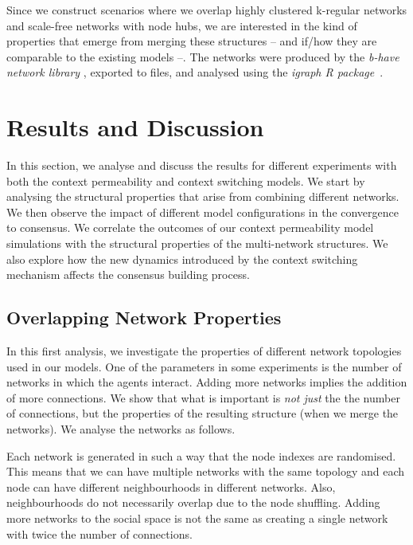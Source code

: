 \documentclass[preprint,number]{elsarticle}
\begin{document}
        Since we construct scenarios where we overlap highly clustered k-regular networks and
        scale-free networks with node hubs, we are interested in the kind of properties that emerge
        from merging these structures -- and if/how they are comparable to the existing models
        --. The networks were produced by the \textit{b-have network library}
        \cite{Nunes:Software:11069}, exported to files, and analysed using the \textit{igraph R
          package}~\cite{igraph2006}.

        \section{Results and Discussion}
        \label{sec:results-discussion}

        \noindent In this section, we analyse and discuss the results for different experiments with
        both the context permeability and context switching models. We start by analysing the
        structural properties that arise from combining different networks. We then observe the
        impact of different model configurations in the convergence to consensus. We correlate the
        outcomes of our context permeability model simulations with the structural properties of the
        multi-network structures. We also explore how the new dynamics introduced by the context
        switching mechanism affects the consensus building process.

        \subsection{Overlapping Network Properties}
        \label{sec:network_properties}
        \noindent In this first analysis, we investigate the properties of different network
        topologies used in our models. One of the parameters in some experiments is the number of
        networks in which the agents interact. Adding more networks implies the addition of more
        connections. We show that what is important is \textit{not just} the the number of
        connections, but the properties of the resulting structure (when we merge the networks). We
        analyse the networks as follows.

        Each network is generated in such a way that the node indexes are randomised. This means
        that we can have multiple networks with the same topology and each node can have different
        neighbourhoods in different networks. Also, neighbourhoods do not necessarily overlap due to
        the node shuffling. Adding more networks to the social space is not the same as creating a
        single network with twice the number of connections.
\end{document}
